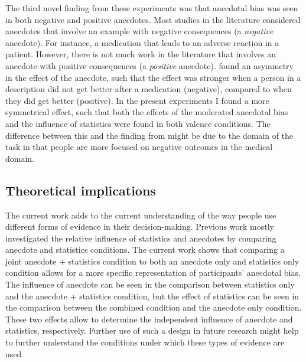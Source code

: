 \documentclass[a4paper, nobind, dvipsnames]{templates/ociamthesis}
\theoremstyle{definition}
\theoremstyle{definition}
\theoremstyle{definition}
\theoremstyle{definition}
\theoremstyle{remark}
\begin{document}
The third novel finding from these experiments was that anecdotal bias was seen
in both negative and positive anecdotes. Most studies in the literature
considered anecdotes that involve an example with negative consequences (a
\emph{negative} anecdote). For instance, a medication that leads to an adverse
reaction in a patient. However, there is not much work in the literature that
involves an anecdote with positive consequences (a \emph{positive} anecdote).
\textcite{jaramillo2019} found an asymmetry in the effect of the anecdote, such that the
effect was stronger when a person in a description did not get better after a
medication (negative), compared to when they did get better (positive). In the
present experiments I found a more symmetrical effect, such that both the
effects of the moderated anecdotal bias and the influence of statistics were
found in both valence conditions. The difference between this and the finding
from \textcite{jaramillo2019} might be due to the domain of the task in that people are
more focused on negative outcomes in the medical domain.

\hypertarget{theoretical-implications-1}{%
\subsection{Theoretical implications}\label{theoretical-implications-1}}

The current work adds to the current understanding of the way people use
different forms of evidence in their decision-making. Previous work mostly
investigated the relative influence of statistics and anecdotes by comparing
anecdote and statistics conditions. The current work shows that comparing a
joint anecdote + statistics condition to both an anecdote only and statistics
only condition allows for a more specific representation of participants'
anecdotal bias. The influence of anecdote can be seen in the comparison between
statistics only and the anecdote + statistics condition, but the effect of
statistics can be seen in the comparison between the combined condition and the
anecdote only condition. These two effects allow to determine the independent
influence of anecdote and statistics, respectively. Further use of such a design
in future research might help to further understand the conditions under which
these types of evidence are used.
\end{document}
